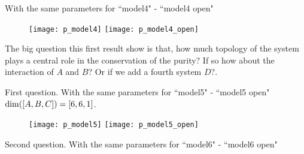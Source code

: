 \documentclass[floatfix]{article}
\newcommand*{\ud}{
\underline{\space\space}}
\begin{document}
With the same parameters for ``model4" - ``model4\ud open"

\begin{figure}[H]
\begin{center}
\texttt{[image: p\_model4]}  
\texttt{[image: p\_model4\_open]}  
\end{center}
\caption{}
\label{p_m4}
\end{figure}


The big question this first result show is that,  how much topology of the system plays a central role in the conservation of the purity? If so how about the interaction of $A$ and $B$?
Or if we add a fourth system $D$?.

First question.
With the same parameters for ``model5" - ``model5\ud open"  ${\rm dim}([A,B,C])=[6,6,1]$.

\begin{figure}[H]
\begin{center}
\texttt{[image: p\_model5]}  
\texttt{[image: p\_model5\_open]}  
\end{center}
\caption{}
\label{p_m4}
\end{figure}


Second question.
With the same parameters for ``model6" - ``model6\ud open"
\end{document}
